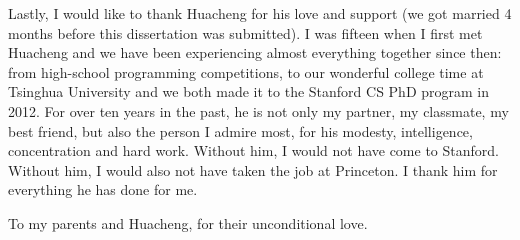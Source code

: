 Lastly, I would like to thank Huacheng for his love and support (we got married 4 months before this dissertation was submitted). I was fifteen when I first met Huacheng and we have been experiencing almost everything together since then: from high-school programming competitions, to our wonderful college time at Tsinghua University and we both made it to the Stanford CS PhD program in 2012. For over ten years in the past, he is not only my partner, my classmate, my best friend, but also the person I admire most, for his modesty, intelligence, concentration and hard work.  Without him, I would not have come to Stanford. Without him, I would also not have taken the job at Princeton. I thank him for everything he has done for me.

\newpage

\begin{flushright}
To my parents and Huacheng, for their unconditional love.
\end{flushright}
